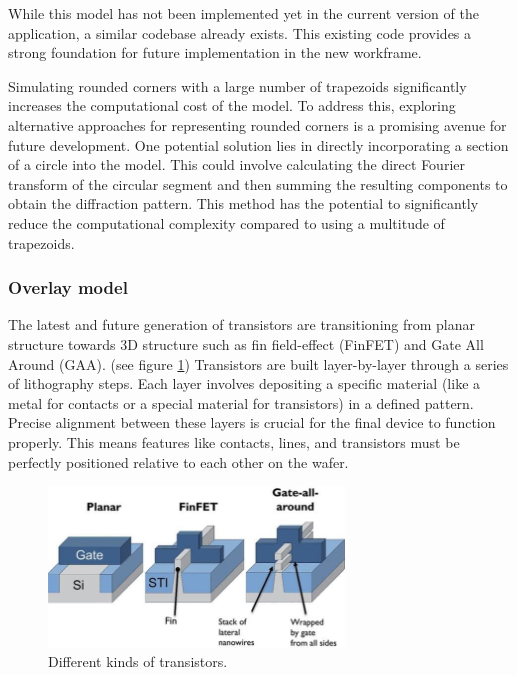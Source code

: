 \medskip

While this model has not been implemented yet in the current version of the application, a similar codebase already exists. This existing
code provides a strong foundation for future implementation in the new workframe.

\medskip

Simulating rounded corners with a large number of trapezoids significantly increases the 
computational cost of the model. To address this, exploring alternative approaches for representing 
rounded corners is a promising avenue for future development. One potential solution lies in 
directly incorporating a section of a circle into the model. This could involve calculating the 
direct Fourier transform of the circular segment and then summing the resulting components to obtain the 
diffraction pattern. This method has the potential to significantly reduce the computational 
complexity compared to using a multitude of trapezoids.

\subsubsection{Overlay model}

The latest and future generation of transistors are transitioning from planar structure towards 3D structure such as fin field-effect (FinFET) and Gate All Around (GAA).
(see figure \ref{fig:planar_vs_3d})
Transistors are built layer-by-layer through a series of lithography steps. 
Each layer involves depositing a specific material (like a metal for contacts or a 
special material for transistors) in a defined pattern. Precise alignment between these 
layers is crucial for the final device to function properly. This means features like 
contacts, lines, and transistors must be perfectly positioned relative to each other 
on the wafer.

\begin{figure}[h]
    \centering
    \includegraphics[width=0.7\textwidth]{images/planar_vs_3d.png}
    \caption{Different kinds of transistors.}
    \label{fig:planar_vs_3d}
\end{figure}

